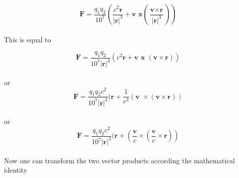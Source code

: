 \documentclass[10pt,titlepage]{article}
\begin{document}
\begin{equation}
\textbf{F} = \frac{{q_1}{q_2}}{{10^7}}( \frac{c^2\textbf{r}}{\vert\textbf{r}\vert^3}+\textbf{v }\textbf{x}( \frac{\textbf{v} \times  \textbf{r}}{\vert\textbf{r}\vert^3}))
\end{equation}\\

This is equal to

\begin{equation}
\textbf{F} = \frac{q_1q_2}{10^7\vert\textbf{r}\vert^3}  (c^2\textbf{r}+\textbf{v }\textbf{x }( {\textbf{v} \times  \textbf{r}}))
\end{equation}\\
or
\begin{equation}
\textbf{F} = \frac{q_1q_2c^2}{10^7\vert\textbf{r}\vert^3}  (\textbf{r}+\frac{1}{c^2}(\textbf{v }\times( {\textbf{v} \times  \textbf{r}}))
\end{equation}\\
or
\begin{equation}
\textbf{F} = \frac{q_1q_2c^2}{10^7\vert\textbf{r}\vert^3}  (\textbf{r}+(\frac{\textbf{v}}{c}\times( {\frac{\textbf{v}}{c}    \times {\textbf{r}}}))
\end{equation}
\\


Now one can transform the two vector products according the mathematical identity
\end{document}
